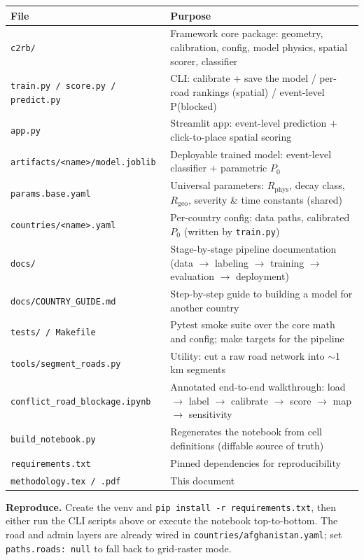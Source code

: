 \documentclass[11pt,a4paper]{article}
\newcommand{\code}[1]{\texttt{\small #1}}
\newcommand{\Rphys}{R_{\mathrm{phys}}}
\newcommand{\Rgeo}{R_{\mathrm{geo}}}
\begin{document}
\begin{table}[h]
\centering
\renewcommand{\arraystretch}{1.2}
\begin{tabularx}{\textwidth}{@{}l X@{}}
\toprule
\textbf{File} & \textbf{Purpose} \\
\midrule
\code{c2rb/} & Framework core package: geometry, calibration, config, model physics, spatial scorer, classifier \\
\code{train.py / score.py / predict.py} & CLI: calibrate + save the model / per-road rankings (spatial) / event-level P(blocked) \\
\code{app.py} & Streamlit app: event-level prediction + click-to-place spatial scoring \\
\code{artifacts/<name>/model.joblib} & Deployable trained model: event-level classifier + parametric $P_0$ \\
\code{params.base.yaml} & Universal parameters: $\Rphys$, decay class, $\Rgeo$, severity \& time constants (shared) \\
\code{countries/<name>.yaml} & Per-country config: data paths, calibrated $P_0$ (written by \code{train.py}) \\
\code{docs/} & Stage-by-stage pipeline documentation (data $\to$ labeling $\to$ training $\to$ evaluation $\to$ deployment) \\
\code{docs/COUNTRY\_GUIDE.md} & Step-by-step guide to building a model for another country \\
\code{tests/ / Makefile} & Pytest smoke suite over the core math and config; make targets for the pipeline \\
\code{tools/segment\_roads.py} & Utility: cut a raw road network into $\sim$1\,km segments \\
\code{conflict\_road\_blockage.ipynb} & Annotated end-to-end walkthrough: load $\to$ label $\to$ calibrate $\to$ score $\to$ map $\to$ sensitivity \\
\code{build\_notebook.py} & Regenerates the notebook from cell definitions (diffable source of truth) \\
\code{requirements.txt} & Pinned dependencies for reproducibility \\
\code{methodology.tex / .pdf} & This document \\
\bottomrule
\end{tabularx}
\end{table}

\textbf{Reproduce.} Create the venv and \code{pip install -r requirements.txt}, then either run the
CLI scripts above or execute the notebook top-to-bottom. The road and admin layers are already
wired in \code{countries/afghanistan.yaml}; set \code{paths.roads: null} to fall back to
grid-raster mode.
\end{document}
